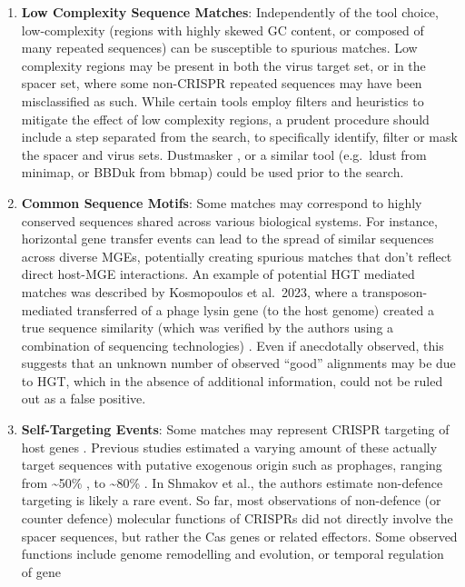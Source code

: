 \documentclass[
]{article}
\begin{document}
\begin{enumerate}
\def\labelenumi{\arabic{enumi}.}
\item
  \textbf{Low Complexity Sequence Matches}: Independently of the tool
  choice, low-complexity (regions with highly skewed GC content, or
  composed of many repeated sequences) can be susceptible to spurious
  matches. Low complexity regions may be present in both the virus
  target set, or in the spacer set, where some non-CRISPR repeated
  sequences may have been misclassified as such. While certain tools
  employ filters and heuristics to mitigate the effect of low complexity
  regions, a prudent procedure should include a step separated from the
  search, to specifically identify, filter or mask the spacer and virus
  sets. Dustmasker \autocite{Morgulis_2006}, or a similar tool
  (e.g.~ldust from minimap, or BBDuk from bbmap) could be used prior to
  the search.
\item
  \textbf{Common Sequence Motifs}: Some matches may correspond to highly
  conserved sequences shared across various biological systems. For
  instance, horizontal gene transfer events can lead to the spread of
  similar sequences across diverse MGEs, potentially creating spurious
  matches that don't reflect direct host-MGE interactions. An example of
  potential HGT mediated matches was described by Kosmopoulos et
  al.~2023, where a transposon-mediated transferred of a phage lysin
  gene (to the host genome) created a true sequence similarity (which
  was verified by the authors using a combination of sequencing
  technologies) \autocite{Kosmopoulos_2023}. Even if anecdotally
  observed, this suggests that an unknown number of observed ``good''
  alignments may be due to HGT, which in the absence of additional
  information, could not be ruled out as a false positive.
\item
  \textbf{Self-Targeting Events}: Some matches may represent CRISPR
  targeting of host genes \autocite{Wimmer_2020}. Previous studies
  estimated a varying amount of these actually target sequences with
  putative exogenous origin such as prophages, ranging from
  \textasciitilde50\% \autocite{Stern_2010}, to \textasciitilde80\%
  \autocite{Shmakov_2017}. In Shmakov et al., the authors estimate
  non-defence targeting is likely a rare event. So far, most
  observations of non-defence (or counter defence) molecular functions
  of CRISPRs did not directly involve the spacer sequences, but rather
  the Cas genes or related effectors. Some observed functions include
  genome remodelling and evolution, or temporal regulation of gene

\end{enumerate}
\end{document}
